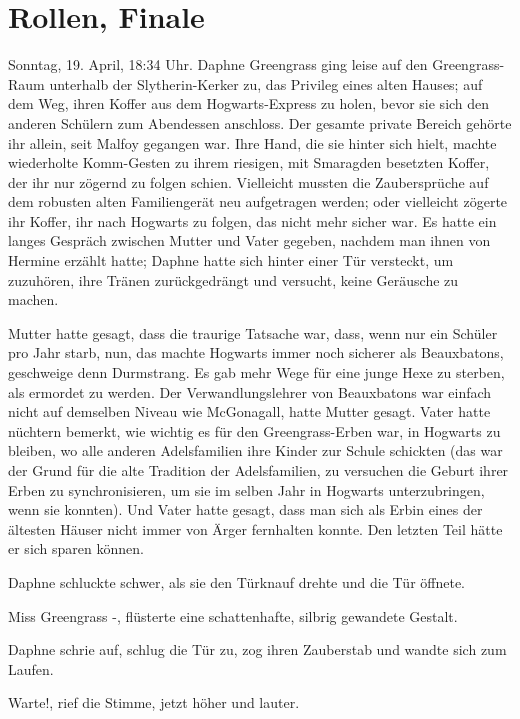 \chapter{Rollen, Finale}

Sonntag, 19. April, 18:34 Uhr. Daphne Greengrass ging leise auf den
Greengrass-Raum unterhalb der Slytherin-Kerker zu, das Privileg eines alten
Hauses; auf dem Weg, ihren Koffer aus dem Hogwarts-Express zu holen, bevor sie
sich den anderen Schülern zum Abendessen anschloss. Der gesamte private Bereich
gehörte ihr allein, seit Malfoy gegangen war. Ihre Hand, die sie hinter sich
hielt, machte wiederholte Komm-Gesten zu ihrem riesigen, mit Smaragden besetzten
Koffer, der ihr nur zögernd zu folgen schien. Vielleicht mussten die
Zaubersprüche auf dem robusten alten Familiengerät neu aufgetragen werden; oder
vielleicht zögerte ihr Koffer, ihr nach Hogwarts zu folgen, das nicht mehr
sicher war. Es hatte ein langes Gespräch zwischen Mutter und Vater gegeben,
nachdem man ihnen von Hermine erzählt hatte; Daphne hatte sich hinter einer Tür
versteckt, um zuzuhören, ihre Tränen zurückgedrängt und versucht, keine
Geräusche zu machen.

Mutter hatte gesagt, dass die traurige Tatsache war, dass, wenn nur ein Schüler
pro Jahr starb, nun, das machte Hogwarts immer noch sicherer als Beauxbatons,
geschweige denn Durmstrang. Es gab mehr Wege für eine junge Hexe zu sterben, als
ermordet zu werden. Der Verwandlungslehrer von Beauxbatons war einfach nicht auf
demselben Niveau wie McGonagall, hatte Mutter gesagt. Vater hatte nüchtern
bemerkt, wie wichtig es für den Greengrass-Erben war, in Hogwarts zu bleiben, wo
alle anderen Adelsfamilien ihre Kinder zur Schule schickten (das war der Grund
für die alte Tradition der Adelsfamilien, zu versuchen die Geburt ihrer Erben zu
synchronisieren, um sie im selben Jahr in Hogwarts unterzubringen, wenn sie
konnten). Und Vater hatte gesagt, dass man sich als Erbin eines der ältesten
Häuser nicht immer von Ärger fernhalten konnte. Den letzten Teil hätte er sich
sparen können.

Daphne schluckte schwer, als sie den Türknauf drehte und die Tür öffnete.

\glqq Miss Greengrass -\grqq{}, flüsterte eine schattenhafte, silbrig gewandete
Gestalt.

Daphne schrie auf, schlug die Tür zu, zog ihren Zauberstab und wandte sich zum
Laufen.

\glqq Warte!\grqq{}, rief die Stimme, jetzt höher und lauter.

